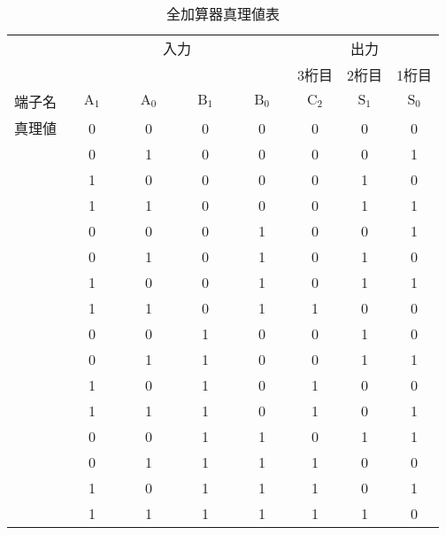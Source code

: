 \begin {table}[ht]
	\begin {center}
		\caption {全加算器真理値表}%
		\begin {tabular}{c|cccc|ccc}\hline
			\multicolumn{1}{c|}{}&%
			\multicolumn{4}{c}{入力}&%
			\multicolumn{3}{|c}{出力}\\ %
			\multicolumn{1}{c|}{}&
			\multicolumn{1}{c}{　　　}&
			\multicolumn{1}{c}{　　　}&
			\multicolumn{1}{c}{　　　}&%
			\multicolumn{1}{c}{　　　}&%
			\multicolumn{1}{|c}{3桁目}&%
			\multicolumn{1}{c}{2桁目}& %
			\multicolumn{1}{c}{1桁目}\\
			\hline
			\multicolumn{1}{c|}{端子名}&%
			\multicolumn{1}{c}{$\mathrm{A_1}$}&%
			\multicolumn{1}{c}{$\mathrm{A_0}$}&%
			\multicolumn{1}{c}{$\mathrm{B_1}$}&%
			\multicolumn{1}{c}{$\mathrm{B_0}$}&%
			\multicolumn{1}{|c}{$\mathrm{C_2}$}&%
			\multicolumn{1}{c}{$\mathrm{S_1}$}&%
			\multicolumn{1}{c}{$\mathrm{S_0}$}\\%
			\hline
			真理値
			&	0	&	0	&	0	&	0	&	0	&	0	&	0	\\
			&	0	&	1	&	0	&	0	&	0	&	0	&	1	\\
			&	1	&	0	&	0	&	0	&	0	&	1	&	0	\\
			&	1	&	1	&	0	&	0	&	0	&	1	&	1	\\
			&	0	&	0	&	0	&	1	&	0	&	0	&	1	\\
			&	0	&	1	&	0	&	1	&	0	&	1	&	0	\\
			&	1	&	0	&	0	&	1	&	0	&	1	&	1	\\
			&	1	&	1	&	0	&	1	&	1	&	0	&	0	\\
			&	0	&	0	&	1	&	0	&	0	&	1	&	0	\\
			&	0	&	1	&	1	&	0	&	0	&	1	&	1	\\
			&	1	&	0	&	1	&	0	&	1	&	0	&	0	\\
			&	1	&	1	&	1	&	0	&	1	&	0	&	1	\\
			&	0	&	0	&	1	&	1	&	0	&	1	&	1	\\
			&	0	&	1	&	1	&	1	&	1	&	0	&	0	\\
			&	1	&	0	&	1	&	1	&	1	&	0	&	1	\\
			&	1	&	1	&	1	&	1	&	1	&	1	&	0	\\
			\hline
		\end{tabular}
		\label {tab:22adder_shinrititab}%
	\end{center}
\end{table}


